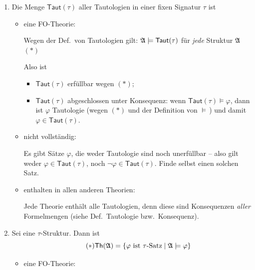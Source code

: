\documentclass[fontsize=11pt, twoside=false, numbers=autoenddot]{scrbook}
\begin{document}
\begin{enumerate}
  \item
    Die Menge $\textsf{Taut}(\tau)$ aller Tautologien in einer fixen Signatur $\tau$ ist
    \begin{itemize}
      \item
        eine FO-Theorie:
        \par
        Wegen der Def.\ von Tautologien gilt:
        $\mathfrak{A} \models \textsf{Taut}(\tau)$ für \emph{jede} Struktur $\mathfrak{A}$\quad $(*)$
        \par
        Also ist
        \begin{itemize}
          \item
            $\textsf{Taut}(\tau)$ erfüllbar wegen $(*)$;
          \item
            $\textsf{Taut}(\tau)$ abgeschlossen unter Konsequenz:
            wenn $\textsf{Taut}(\tau) \models \varphi$,
            dann ist $\varphi$ Tautologie (wegen $(*)$ und der Definition von $\models$\,)
            und damit $\varphi \in \textsf{Taut}(\tau)$.
        \end{itemize}
        \par\smallskip
      \item
        nicht vollständig:
        \par
        Es gibt Sätze $\varphi$, die weder Tautologie sind noch unerfüllbar -- also gilt weder
        $\varphi \in \textsf{Taut}(\tau)$, noch $\lnot\varphi \in \textsf{Taut}(\tau)$.
        Finde selbst einen solchen Satz.
        \par\smallskip
      \item
        enthalten in allen anderen Theorien:
        \par
        Jede Theorie enthält alle Tautologien, denn diese sind Konsequenzen \emph{aller} Formelmengen (siehe Def.\ Tautologie bzw.\ Konsequenz).
    \end{itemize}
    \par\smallskip
  \item
    Sei \Amf eine $\tau$-Struktur. Dann ist
    \[
      \tag{$*$}
      \textsf{Th}(\mathfrak{A})=\{ \varphi \text{ ist $\tau$-Satz} \mid \mathfrak{A} \models \varphi \}
    \]
    \begin{itemize}
      \item
        eine FO-Theorie:
        \par
        \begin{itemize}

\end{itemize}
\end{itemize}
\end{enumerate}
\end{document}
